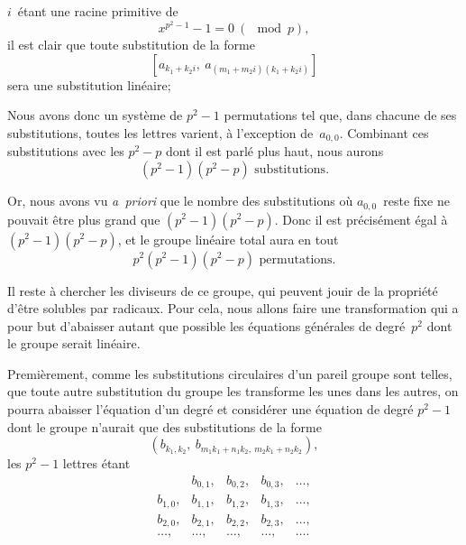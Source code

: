$i$~étant une racine primitive de
\[
x^{p^{2}-1}\! - 1 = 0\ (\mod p),
\]
il est clair que toute substitution de la forme
\[
[a_{k_{1}+k_{2} i},\ a_{(m_{1}+m_{2}i)(k_{1}+k_{2}i)}]
\]
sera une substitution linéaire; 

Nous avons donc un système de $p^{2} - 1$ permutations tel que,
dans chacune de ses substitutions, toutes les lettres varient, à
l'exception de~$a_{0,0}$. Combinant ces substitutions avec les $p^{2} - p$
dont il est parlé plus haut, nous aurons
\[
(p^{2} - 1)(p^{2} - p) \text{ substitutions}.
\]

Or, nous avons vu \textit{a~priori} que le nombre des substitutions
où $a_{0,0}$~reste fixe ne pouvait être plus grand que $(p^{2} - 1)(p^{2} - p)$.
Donc il est précisément égal à $(p^{2} - 1)(p^{2} - p)$, et le groupe
linéaire total aura en tout
\[
p^{2}(p^{2} - 1)(p^{2} - p) \text{ permutations}.
\]

Il reste à chercher les diviseurs de ce groupe, qui peuvent
jouir de la propriété d'être solubles par radicaux. Pour cela, nous
allons faire une transformation qui a pour but d'abaisser autant
que possible les équations générales de degré~$p^{2}$ dont le groupe
serait linéaire.

Premièrement, comme les substitutions circulaires d'un pareil
groupe sont telles, que toute autre substitution du groupe les
transforme les unes dans les autres, on pourra abaisser l'équation
d'un degré et considérer une équation de degré $p^{2} - 1$ dont le
groupe n'aurait que des substitutions de la forme
\[
(b_{k_{1}, k_{2}},\ b_{m_{1}k_{1}+n_{1}k_{2},\: m_{2}k_{1}+n_{2}k_{2}}),
\]
les $p^{2} - 1$ lettres étant
\[
\begin{array}{*{5}{l}}
         &b_{0,1}, &b_{0,2}, &b_{0,3}, &\dots,\\
b_{1,0}, &b_{1,1}, &b_{1,2}, &b_{1,3}, &\dots,\\
b_{2,0}, &b_{2,1}, &b_{2,2}, &b_{2,3}, &\dots,\\
\dots,  &\dots,  &\dots,  &\dots,  &\dots.
\end{array}
\]
